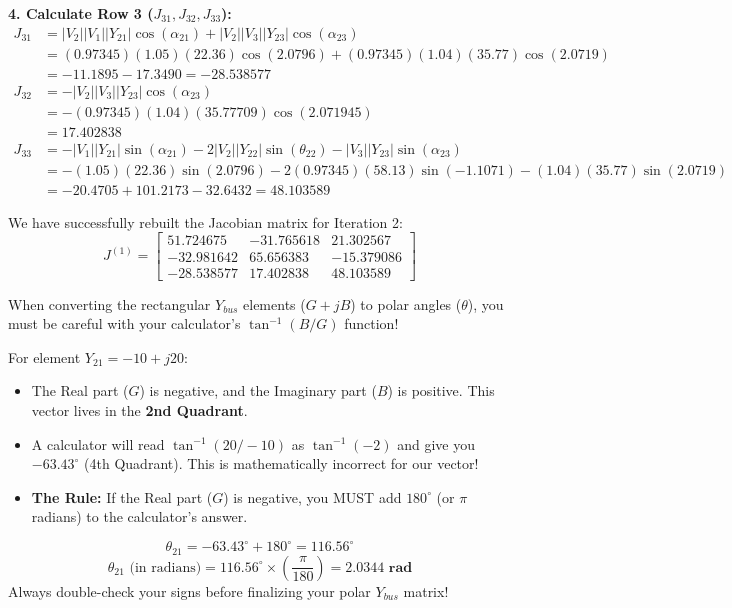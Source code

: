 \documentclass[11pt]{article}
\begin{document}
\begin{stepbox}
\textbf{4. Calculate Row 3 ($J_{31}, J_{32}, J_{33}$):}
\begin{align*}
    J_{31} &= |V_2||V_1||Y_{21}|\cos(\alpha_{21}) + |V_2||V_3||Y_{23}|\cos(\alpha_{23}) \\
    &= (0.97345)(1.05)(22.36)\cos(2.0796) + (0.97345)(1.04)(35.77)\cos(2.0719) \\
    &= -11.1895 - 17.3490 = \mathbf{-28.538577} \\[0.3cm]
    J_{32} &= -|V_2||V_3||Y_{23}|\cos(\alpha_{23}) \\
    &= -(0.97345)(1.04)(35.77709)\cos(2.071945) \\
    &= \mathbf{17.402838} \\[0.3cm]
    J_{33} &= -|V_1||Y_{21}|\sin(\alpha_{21}) - 2|V_2||Y_{22}|\sin(\theta_{22}) - |V_3||Y_{23}|\sin(\alpha_{23}) \\
    &= -(1.05)(22.36)\sin(2.0796) - 2(0.97345)(58.13)\sin(-1.1071) - (1.04)(35.77)\sin(2.0719) \\
    &= -20.4705 + 101.2173 - 32.6432 = \mathbf{48.103589}
\end{align*}

We have successfully rebuilt the Jacobian matrix for Iteration 2:
\begin{equation*}
    J^{(1)} = 
    \begin{bmatrix} 
    51.724675 & -31.765618 & 21.302567 \\ 
    -32.981642 & 65.656383 & -15.379086 \\ 
    -28.538577 & 17.402838 & 48.103589 
    \end{bmatrix}
\end{equation*}
\end{stepbox}
\begin{examtrap}
When converting the rectangular $Y_{bus}$ elements ($G + jB$) to polar angles ($\theta$), you must be careful with your calculator's $\tan^{-1}(B/G)$ function!

For element $Y_{21} = -10 + j20$:
\begin{itemize}
    \item The Real part ($G$) is negative, and the Imaginary part ($B$) is positive. This vector lives in the \textbf{2nd Quadrant}.
    \item A calculator will read $\tan^{-1}(20/-10)$ as $\tan^{-1}(-2)$ and give you $-63.43^\circ$ (4th Quadrant). This is mathematically incorrect for our vector!
    \item \textbf{The Rule:} If the Real part ($G$) is negative, you MUST add $180^\circ$ (or $\pi$ radians) to the calculator's answer.
\end{itemize}
$$ \theta_{21} = -63.43^\circ + 180^\circ = 116.56^\circ $$
$$ \theta_{21} \text{ (in radians)} = 116.56^\circ \times \left( \frac{\pi}{180} \right) = \mathbf{2.0344 \text{ rad}} $$
Always double-check your signs before finalizing your polar $Y_{bus}$ matrix!
\end{examtrap}
\end{document}
